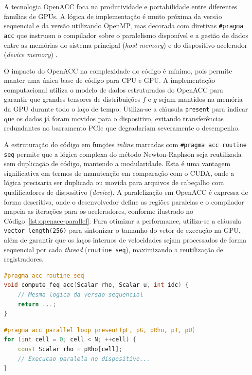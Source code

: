 A tecnologia OpenACC foca na produtividade e portabilidade entre diferentes famílias de GPUs.
A lógica de implementação é muito próxima da versão sequencial e da versão utilizando OpenMP, mas decorada com diretivas \texttt{\#pragma acc} que instruem o compilador sobre o paralelismo disponível e a gestão de dados entre as memórias do sistema principal (\textit{host memory}) e do dispositivo acelerador (\textit{device memory}) \parencite{Wolfe2018}.

O impacto do OpenACC na complexidade do código é mínimo, pois permite manter uma única base de código para CPU e GPU. A implementação computacional utiliza o modelo de dados estruturados do OpenACC para garantir que grandes tensores de distribuições $f$ e $g$ sejam mantidos na memória da GPU durante todo o laço de tempo.
Utiliza-se a cláusula \texttt{present} para indicar que os dados já foram movidos para o dispositivo, evitando transferências redundantes no barramento PCIe que degradariam severamente o desempenho.

A estruturação do código em funções \textit{inline} marcadas com \texttt{\#pragma acc routine seq} permite que a lógica complexa do método Newton-Raphson seja reutilizada sem duplicação de código, mantendo a modularidade.
Esta é uma vantagem significativa em termos de manutenção em comparação com o CUDA, onde a lógica precisaria ser duplicada ou movida para arquivos de cabeçalho com qualificadores de dispositivo (\textit{device}).
A paralelização em OpenACC é expressa de forma descritiva, onde o desenvolvedor define as regiões paralelas e o compilador mapeia as iterações para os aceleradores, conforme ilustrado no Código~\ref{lst:openacc-parallel}.
Para otimizar a performance, utiliza-se a cláusula \texttt{vector\_length(256)} para sintonizar o tamanho do vetor de execução na GPU, além de garantir que os laços internos de velocidades sejam processados de forma sequencial por cada \textit{thread} (\texttt{routine seq}), maximizando a reutilização de registradores.
\begin{lstlisting}[language=C++, caption={Uso de acc routine para reutilização de código.}, label={lst:openacc-routine}, float=ht]
#pragma acc routine seq
void compute_feq_acc(Scalar rho, Scalar u, int idc) {
    // Mesma logica da versao sequencial
    return ...;
}
\end{lstlisting}
\begin{lstlisting}[language=C++, caption={Diretivas OpenACC para paralelização em GPU.}, label={lst:openacc-parallel}, float=ht]
#pragma acc parallel loop present(pF, pG, pRho, pT, pU)
for (int cell = 0; cell < N; ++cell) {
    const Scalar rho = pRho[cell];
    // Execucao paralela no dispositivo...
}
\end{lstlisting}

